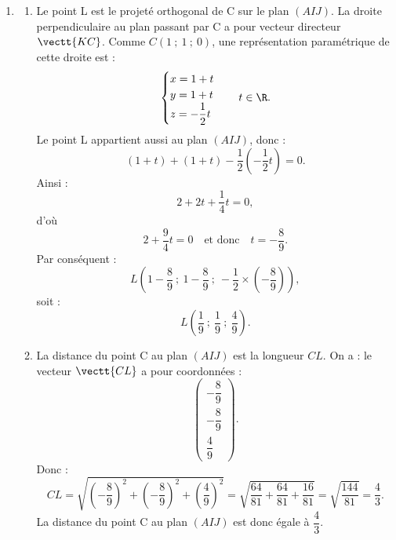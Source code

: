 \begin{enumerate}
\begin{enumerate}
		\item Comme le vecteur $\vectt{KC}$ a pour coordonnées $\begin{pmatrix}1\\1\\-\dfrac12\end{pmatrix}$ et est un vecteur normal au plan $(AIJ)$, une équation cartésienne de ce plan est de la forme :
		\[
		x+y-\dfrac12 z+d=0.
		\]
		Le point $A(0~;~0~;~0)$ appartient au plan, donc $d=0$.
		Ainsi, une équation cartésienne du plan $(AIJ)$ est :
		\[
		x+y-\dfrac12 z=0.
		\]
	\end{enumerate}

	\item \begin{enumerate}
		\item Le point L est le projeté orthogonal de C sur le plan $(AIJ)$.
		La droite perpendiculaire au plan passant par C a pour vecteur directeur $\vectt{KC}$.
		Comme $C(1~;~1~;~0)$, une représentation paramétrique de cette droite est :
		\[
		\begin{cases}
		x=1+t\\
		y=1+t\\
		z=-\dfrac12t
		\end{cases}
		\quad t\in\R.
		\]
		Le point L appartient aussi au plan $(AIJ)$, donc :
		\[
		(1+t)+(1+t)-\dfrac12\left(-\dfrac12t\right)=0.
		\]
		Ainsi :
		\[
		2+2t+\dfrac14t=0,
		\]
		d'où
		\[
		2+\dfrac94t=0
		\quad\text{et donc}\quad
		t=-\dfrac89.
		\]
		Par conséquent :
		\[
		L\left(1-\dfrac89~;~1-\dfrac89~;~-\dfrac12\times\left(-\dfrac89\right)\right),
		\]
		soit :
		\[
		L\left(\dfrac19~;~\dfrac19~;~\dfrac49\right).
		\]

		\item La distance du point C au plan $(AIJ)$ est la longueur $CL$.
		On a :
		le vecteur $\vectt{CL}$ a pour coordonnées :
		\[
		\begin{pmatrix}-\dfrac89\\-\dfrac89\\\dfrac49\end{pmatrix}.
		\]
		Donc :
		\[
		CL=\sqrt{\left(-\dfrac89\right)^2+\left(-\dfrac89\right)^2+\left(\dfrac49\right)^2}
		=\sqrt{\dfrac{64}{81}+\dfrac{64}{81}+\dfrac{16}{81}}
		=\sqrt{\dfrac{144}{81}}
		=\dfrac43.
		\]
		La distance du point C au plan $(AIJ)$ est donc égale à $\dfrac43$.
	\end{enumerate}


\end{enumerate}
